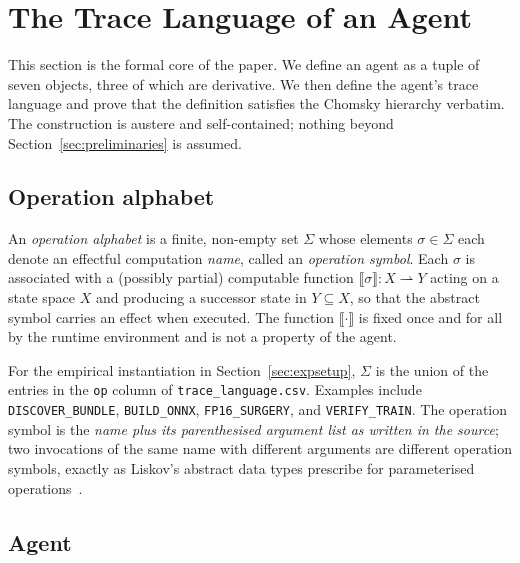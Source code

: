 \section{The Trace Language of an Agent}
\label{sec:trace}

This section is the formal core of the paper.  We define an agent
as a tuple of seven objects, three of which are derivative.  We
then define the agent's trace language and prove that the
definition satisfies the Chomsky hierarchy verbatim.  The
construction is austere and self-contained; nothing beyond
Section~\ref{sec:preliminaries} is assumed.

\subsection{Operation alphabet}

\begin{definition}
\label{def:opalpha}
An \emph{operation alphabet} is a finite, non-empty set $\Sigma$
whose elements $\sigma\in\Sigma$ each denote an effectful
computation \emph{name}, called an \emph{operation symbol}.
Each $\sigma$ is associated with a (possibly partial) computable
function $\llbracket\sigma\rrbracket : X \rightharpoonup Y$
acting on a state space $X$ and producing a successor state in
$Y\subseteq X$, so that the abstract symbol carries an effect when
executed.  The function $\llbracket\cdot\rrbracket$ is fixed once
and for all by the runtime environment and is not a property of
the agent.
\end{definition}

\noindent For the empirical instantiation in
Section~\ref{sec:expsetup}, $\Sigma$ is the union of the
entries in the \texttt{op} column of \texttt{trace\_language.csv}.
Examples include \texttt{DISCOVER\_BUNDLE}, \texttt{BUILD\_ONNX},
\texttt{FP16\_SURGERY}, and \texttt{VERIFY\_TRAIN}.
The operation symbol is the \emph{name plus its parenthesised
argument list as written in the source}; two invocations of the
same name with different arguments are different operation
symbols, exactly as Liskov's abstract data types prescribe for
parameterised operations~\cite{liskov1974abstraction}.

\subsection{Agent}

